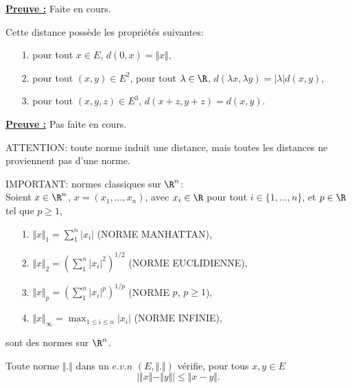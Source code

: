 \documentclass[class=report,crop=false]{standalone}
\begin{document}
\noindent \underline{\bf Preuve :}
Faite en cours.



\begin{proposition}
\textcolor[rgb]{0.50,0.00,0.25}{
Cette distance possède les propriétés suivantes:
\begin{itemize}
\item[1.] pour tout $x \in E$, $d(0,x)= \Vert x \Vert$,
\item[2.] pour tout $(x,y) \in E^2$, pour tout $\lambda \in \R$, $d(\lambda x, \lambda y)=\vert \lambda\vert d(x,y)$,
\item[3.] pour tout $(x,y,z) \in E^3$, $d(x+z,y+z)=d(x,y)$.
\end{itemize}
}
\end{proposition}

\noindent \underline{\bf Preuve :}
Pas faite en cours.


 

\begin{remarque*}
\textcolor[rgb]{0.00,0.00,1.00}{
\noindent ATTENTION: toute norme induit une distance, mais toutes les distances ne proviennent
pas d'une norme.
}
\end{remarque*}



\begin{exemple} \textcolor[rgb]{0.00,0.59,0.00}
{IMPORTANT: normes classiques sur $\R^n$:\\
Soient $x \in \R^n$, $x=(x_1,...,x_n)$, avec $x_i \in \R$ pour tout $i \in \lbrace 1, ..., n \rbrace$,
et $p \in \R$ tel que $p \geq 1$, \\
\begin{itemize}
\item[1.] $\Vert x \Vert_1 = \displaystyle \sum_1^n \vert x_i \vert$ (NORME MANHATTAN),
\item[2.] $\Vert x \Vert_2 =( \displaystyle \sum_1^n \vert x_i \vert ^2)^{1/2}$ (NORME EUCLIDIENNE),
\item[3.] $\Vert x \Vert_p =( \displaystyle \sum_1^n \vert x_i \vert ^p)^{1/p}$ (NORME $p$, $p \geq 1$),
\item[4.] $\Vert x \Vert_{\infty} =\displaystyle  \max_{1 \leq i \leq n} \vert x_i \vert$ (NORME INFINIE), 
\end{itemize}
sont des normes sur $\R^n$.
}
\end{exemple}

\begin{proposition}
\textcolor[rgb]{0.50,0.00,0.25}{
Toute norme $\Vert . \Vert$ dans un $e.v.n$ $(E,\Vert . \Vert)$ vérifie, pour tous $x,y \in E$
\begin{equation*}
\left \vert \Vert x \Vert - \Vert y\Vert \right \vert \leq \Vert x-y\Vert.
\end{equation*}
}
\end{proposition}
\end{document}
